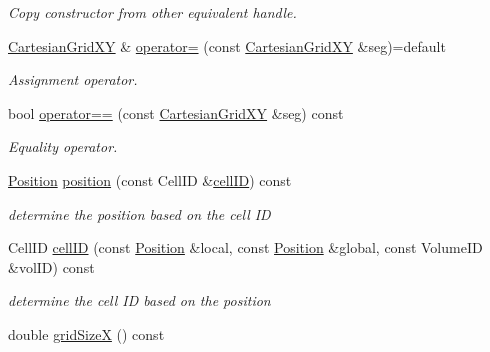 \begin{DoxyCompactItemize}
\begin{DoxyCompactList}\small\item\em Copy constructor from other equivalent handle. \end{DoxyCompactList}\item 
\hyperlink{class_d_d4hep_1_1_geometry_1_1_cartesian_grid_x_y}{Cartesian\+Grid\+XY} \& \hyperlink{class_d_d4hep_1_1_geometry_1_1_cartesian_grid_x_y_a56de7a63a2bd5be8f60e7c54696ca4c7}{operator=} (const \hyperlink{class_d_d4hep_1_1_geometry_1_1_cartesian_grid_x_y}{Cartesian\+Grid\+XY} \&seg)=default
\begin{DoxyCompactList}\small\item\em Assignment operator. \end{DoxyCompactList}\item 
bool \hyperlink{class_d_d4hep_1_1_geometry_1_1_cartesian_grid_x_y_abf9c6024e8f908d291374e4d4cd1ed21}{operator==} (const \hyperlink{class_d_d4hep_1_1_geometry_1_1_cartesian_grid_x_y}{Cartesian\+Grid\+XY} \&seg) const
\begin{DoxyCompactList}\small\item\em Equality operator. \end{DoxyCompactList}\item 
\hyperlink{namespace_d_d4hep_1_1_geometry_a55083902099d03506c6db01b80404900}{Position} \hyperlink{class_d_d4hep_1_1_geometry_1_1_cartesian_grid_x_y_ac835aa93486b46056e0516ce276ffca5}{position} (const Cell\+ID \&\hyperlink{class_d_d4hep_1_1_geometry_1_1_cartesian_grid_x_y_a83c05bd3b39fab868f02b6e44e206a26}{cell\+ID}) const
\begin{DoxyCompactList}\small\item\em determine the position based on the cell ID \end{DoxyCompactList}\item 
Cell\+ID \hyperlink{class_d_d4hep_1_1_geometry_1_1_cartesian_grid_x_y_a83c05bd3b39fab868f02b6e44e206a26}{cell\+ID} (const \hyperlink{namespace_d_d4hep_1_1_geometry_a55083902099d03506c6db01b80404900}{Position} \&local, const \hyperlink{namespace_d_d4hep_1_1_geometry_a55083902099d03506c6db01b80404900}{Position} \&global, const Volume\+ID \&vol\+ID) const
\begin{DoxyCompactList}\small\item\em determine the cell ID based on the position \end{DoxyCompactList}\item 
double \hyperlink{class_d_d4hep_1_1_geometry_1_1_cartesian_grid_x_y_abb349f13ff34de095c5c0ada99401986}{grid\+SizeX} () const

\end{DoxyCompactItemize}

